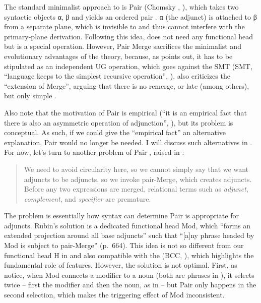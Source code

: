 \documentclass[output=paper]{langsci/langscibook}
\begin{document}
The standard minimalist approach to  is Pair  (Chomsky
\citeyear{Chomsky2000}, \citeyear{Chomsky2004}), which takes two syntactic
objects α,  β and yields an ordered pair . α (the adjunct) is
attached to β from a separate plane, which is invisible to and thus cannot
interfere with the primary-plane derivation. Following this idea, 
does not need any functional head but is a special operation. However, Pair
Merge sacrifices the minimalist and evolutionary advantages of the theory,
because, as \citet[52]{Collins2017} points out, it has to be stipulated as an
independent \gls{UG} operation, which goes against the \glsdesc{SMT}
(\gls{SMT}, ``language keeps to the simplest recursive operation'',
\citealt[71]{BerwickChomsky2016}).  \citet[40]{Chomsky2013} also criticizes the
``extension of Merge'', arguing that there is no remerge,  or
late  (among others), but only simple .

Also note that the motivation of Pair  is empirical (``it is an empirical
fact that there is also an asymmetric operation of adjunction'',
\citealt[117]{Chomsky2004}), but its problem is conceptual. As such, if we
could give the ``empirical fact'' an alternative explanation, Pair  would
no longer be needed. I will discuss such alternatives in . For
now, let's turn to another problem of Pair , raised in \citet{Rubin2003}:

\blockquote[{\citealt[663]{Rubin2003}}]{We need to avoid circularity here, so
    we cannot simply say that we want adjuncts to be adjuncts, so we invoke
    pair-Merge, which creates adjuncts.  Before any two expressions are merged,
    relational terms such as \emph{adjunct}, \emph{complement}, and
\emph{specifier} are premature.}\largerpage

\noindent The problem is essentially how syntax can determine Pair  is
appropriate for adjuncts. Rubin's solution is a dedicated functional head Mod,
which ``forms an extended projection around all base adjuncts'' such that
``[a]ny phrase headed by Mod is subject to pair-Merge'' (p.~664). This idea is
not so different from our functional head H in  and also compatible
with the  (\gls{BCC},
\citealt{Baker2008}), which highlights the fundamental role of features.
However, the solution is not optimal. First, as \citet[2]{ArsenijevicSio2009}
notice, when Mod connects a modifier to a noun (both are phrases in
\citealt{Rubin2003}), it selects twice -- first the modifier and then the
noun, as in  -- but Pair  only happens in the second
selection, which makes the triggering effect of Mod inconsistent.
\end{document}

